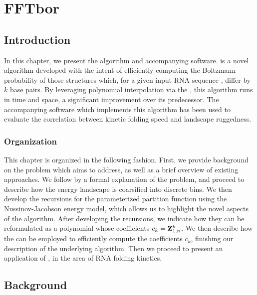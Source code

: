
\chapter{FFTbor}
\label{ch:fftbor}


\section{Introduction}
\label{sec:fftbor:intro}

In this chapter, we present the \fftbor algorithm and accompanying software.
\fftbor is a novel algorithm developed with the intent of efficiently computing
the Boltzmann probability of those structures which, for a given input RNA
sequence \seq, differ by $k$ base pairs. By leveraging polynomial interpolation
via the \fft, this algorithm runs in  time and
 space, a significant improvement over its predecessor. The accompanying
software which implements this algorithm has been used to evaluate the
correlation between kinetic folding speed and landscape ruggedness.

\subsection{Organization}
\label{subsec:fftbor:org}

This chapter is organized in the following fashion. First, we provide
background on
the problem which \fftbor aims to address, as well as a brief overview of
existing approaches. We follow by a formal explanation of the problem, and
proceed to describe how the energy landscape is coarsified into discrete bins.
We then develop the recursions for the parameterized partition function using
the Nussinov-Jacobson energy model, which allows us to highlight the novel aspects
of the algorithm. After developing the recursions, we indicate how they can be
reformulated as a polynomial whose coefficients $c_k={\bf Z}^{k}_{1,n}$. We then
describe how the \fft can be employed to efficiently compute the coefficients
$c_k$, finishing our description of the underlying algorithm. Then we proceed
to present an application of \fftbor, in the area of RNA folding kinetics.

\section{Background}
\label{sec:fftbor:bkgrnd}

